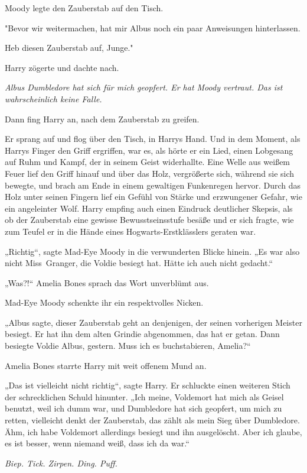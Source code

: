 {Moody legte den Zauberstab auf den Tisch.

"Bevor wir weitermachen, hat mir Albus noch ein paar Anweisungen hinterlassen.

Heb diesen Zauberstab auf, Junge."

Harry zögerte und dachte nach.

\emph{Albus Dumbledore hat sich für mich geopfert. Er hat Moody vertraut. Das ist wahrscheinlich keine Falle.}

Dann fing Harry an, nach dem Zauberstab zu greifen.

Er sprang auf und flog über den Tisch, in Harrys Hand. Und in dem Moment, als Harrys Finger den Griff ergriffen, war es, als hörte er ein Lied, einen Lobgesang auf Ruhm und Kampf, der in seinem Geist widerhallte. Eine Welle aus weißem Feuer lief den Griff hinauf und über das Holz, vergrößerte sich, während sie sich bewegte, und brach am Ende in einem gewaltigen Funkenregen hervor. Durch das Holz unter seinen Fingern lief ein Gefühl von Stärke und erzwungener Gefahr, wie ein angeleinter Wolf. Harry empfing auch einen Eindruck deutlicher Skepsis, als ob der Zauberstab eine gewisse Bewusstseinsstufe besäße und er sich fragte, wie zum Teufel er in die Hände eines Hogwarts-Erstklässlers geraten war.

„Richtig“, sagte Mad-Eye Moody in die verwunderten Blicke hinein. „Es war also nicht Miss~Granger, die Voldie besiegt hat. Hätte ich auch nicht gedacht.“

„Was?!“ Amelia Bones sprach das Wort unverblümt aus.

Mad-Eye Moody schenkte ihr ein respektvolles Nicken.

„Albus sagte, dieser Zauberstab geht an denjenigen, der seinen vorherigen Meister besiegt. Er hat ihn dem alten Grindie abgenommen, das hat er getan. Dann besiegte Voldie Albus, gestern. Muss ich es buchstabieren, Amelia?“

Amelia Bones starrte Harry mit weit offenem Mund an.

„Das ist vielleicht nicht richtig“, sagte Harry. Er schluckte einen weiteren Stich der schrecklichen Schuld hinunter. „Ich meine, Voldemort hat mich als Geisel benutzt, weil ich dumm war, und Dumbledore hat sich geopfert, um mich zu retten, vielleicht denkt der Zauberstab, das zählt als mein Sieg über Dumbledore. Ähm, ich habe Voldemort allerdings besiegt und ihn ausgelöscht. Aber ich glaube, es ist besser, wenn niemand weiß, dass ich da war.“

\emph{Biep. Tick. Zirpen. Ding. Puff.}

}
